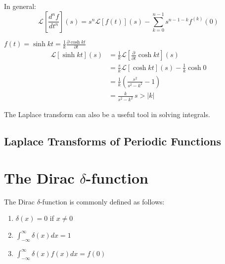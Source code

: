 \documentclass{physics_notes}
\newcommand{\zintfty}{\int_0^\infty}
\renewcommand{\L}[2]{\mathcal{L}\left[#1\right](#2)}
\DeclareMathOperator{\sgn}{sgn}
\begin{document}
In general:
\begin{equation*}
\L{\frac{d^n f}{dt^n}}{s} = s^n\L{f(t)}{s} - \sum_{k=0}^{n-1} s^{n-1-k}f^{(k)}(0)
\end{equation*}

\begin{example}{$f(t) = \sinh{kt} = \frac{1}{k}\frac{\partial \cosh{kt}}{\partial t}$}
\begin{align*}
\L{\sinh{kt}}{s} &= \frac{1}{k}\L{\frac{\partial}{\partial t}\cosh{kt}}{s} \\
&= \frac{s}{k}\L{\cosh{kt}}{s} - \frac{1}{k}\cosh{0} \\
&= \frac{1}{k}\left(\frac{s^2}{s^2 - k^2} - 1\right) \\
&= \frac{k}{s^2 - k^2} \, s>|k|
\end{align*}
\end{example}

The Laplace transform can also be a useful tool in solving integrals.



\subsection{Laplace Transforms of Periodic Functions}


\section{The Dirac $\delta$-function}\label{sec:dirac_delta}

The Dirac $\delta$-function is commonly defined as follows:

\begin{enumerate}
	\item $\delta(x) = 0$ if $x$
	\item $\int_{-\infty}^\infty \delta(x) dx = 1$
	\item $\int_{-\infty}^\infty \delta(x) f(x) dx = f(0)$
\end{enumerate}
\end{document}
